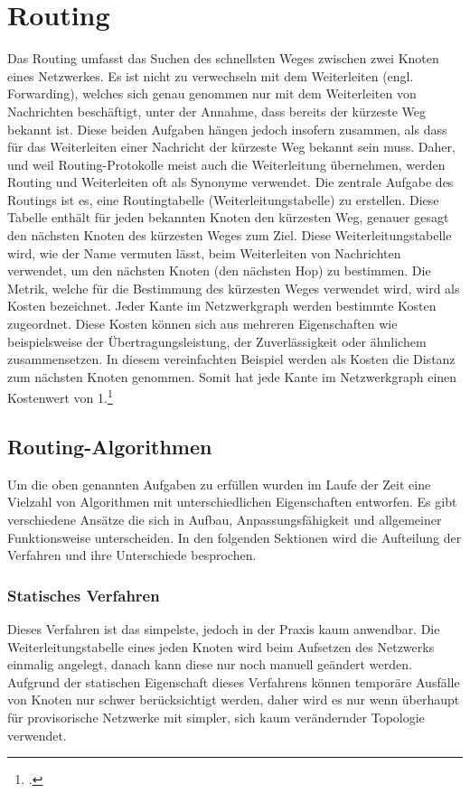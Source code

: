 \chapter{Routing}
Das Routing umfasst das Suchen des schnellsten Weges zwischen zwei Knoten eines Netzwerkes. Es ist nicht zu verwechseln mit dem Weiterleiten (engl. Forwarding), welches sich genau genommen nur mit dem Weiterleiten von Nachrichten beschäftigt, unter der Annahme, dass bereits der kürzeste Weg bekannt ist. Diese beiden Aufgaben hängen jedoch insofern zusammen, als dass für das Weiterleiten einer Nachricht der kürzeste Weg bekannt sein muss. Daher, und weil Routing-Protokolle meist auch die Weiterleitung übernehmen, werden Routing und Weiterleiten oft als Synonyme verwendet. Die zentrale Aufgabe des Routings ist es, eine Routingtabelle (Weiterleitungstabelle) zu erstellen. Diese Tabelle enthält für jeden bekannten Knoten den kürzesten Weg, genauer gesagt den nächsten Knoten des kürzesten Weges zum Ziel. Diese Weiterleitungstabelle wird, wie der Name vermuten lässt, beim Weiterleiten von Nachrichten verwendet, um den nächsten Knoten (den nächsten Hop) zu bestimmen. Die Metrik, welche für die Bestimmung des kürzesten Weges verwendet wird, wird als Kosten bezeichnet. Jeder Kante im Netzwerkgraph werden bestimmte Kosten zugeordnet. Diese Kosten können sich aus mehreren Eigenschaften wie beispielsweise der Übertragungsleistung, der Zuverlässigkeit oder ähnlichem zusammensetzen. In diesem vereinfachten Beispiel werden als Kosten die Distanz zum nächsten Knoten genommen. Somit hat jede Kante im Netzwerkgraph einen Kostenwert von 1.\footcite{distsys1}

\section{Routing-Algorithmen}
Um die oben genannten Aufgaben zu erfüllen wurden im Laufe der Zeit eine Vielzahl von Algorithmen mit unterschiedlichen Eigenschaften entworfen. Es gibt verschiedene Ansätze die sich in Aufbau, Anpassungsfähigkeit und allgemeiner Funktionsweise unterscheiden. In den folgenden Sektionen wird die Aufteilung der Verfahren und ihre Unterschiede besprochen.

\subsection{Statisches Verfahren}
Dieses Verfahren ist das simpelste, jedoch in der Praxis kaum anwendbar. Die Weiterleitungstabelle eines jeden Knoten wird beim Aufsetzen des Netzwerks einmalig angelegt, danach kann diese nur noch manuell geändert werden. Aufgrund der statischen Eigenschaft dieses Verfahrens können temporäre Ausfälle von Knoten nur schwer berücksichtigt werden, daher wird es nur wenn überhaupt für provisorische Netzwerke mit simpler, sich kaum verändernder Topologie verwendet.

